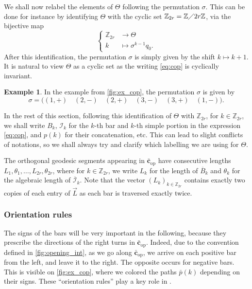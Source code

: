 \documentclass[12pt,twoside]{article}
\theoremstyle{theorem}
\theoremstyle{remark}
\theoremstyle{definition}
\theoremstyle{example}
\newtheorem{expl}[thm]{Example}
\newcommand{\Z}{\mathbb{Z}}
\newcommand{\1}[1]{\mathds{1}_{#1}}
\newcommand{\copg}{{\bar{\mathbf{c}}}_{\mathrm{op}}}
\newcommand{\cI}{\mathcal{I}}
\begin{document}
We shall now relabel the elements of $\Theta$ following the permutation $\sigma$. This can be done
for instance by identifying $\Theta$ with the cyclic set $\Z_{2r} = \Z \diagup 2r \Z$, via the
bijective map
\begin{equation}
  \begin{cases}
    \Z_{2r} & \rightarrow \Theta \\
    k & \mapsto \sigma^{k-1} q_0.
  \end{cases}
\end{equation}
After this identification, the permutation $\sigma$ is simply given by the shift $k \mapsto k+1$.
It is natural to view $\Theta$ as a cyclic set as the writing \eqref{eq:cop} is cyclically
invariant. 

\begin{expl}
  In the example from \cref{fig:ex_cop}, the permutation $\sigma$ is given by
  \begin{equation}
    \label{eq:sigma_expl}
    \sigma = \big((1,+) \quad (2,-) \quad (2,+) \quad (3,-) \quad (3,+) \quad (1,-)\big).
  \end{equation}
\end{expl}

In the rest of this section, following this identification of $\Theta$ with $\Z_{2r}$, for
$k \in \Z_{2r}$, we shall write $B_k$, $\cI_k$ for the $k$-th bar and $k$-th simple portion in the
expression \eqref{eq:cop}, and $p(k)$ for their concatenation, etc. This can lead to slight
conflicts of notations, so we shall always try and clarify which labelling we are using for
$\Theta$.

The orthogonal geodesic segments appearing in $\bar{\mathbf{c}}_{\mathrm{op}}$ have consecutive
lengths $L_1, \theta_1, \ldots, L_{2r}, \theta_{2r}$, where for $k \in \Z_{2r}$, we write $L_k$ for
the length of $\overline{B}_k$ and $\theta_k$ for the algebraic length of $\overline{\cI}_k$. Note
that the vector $(L_k)_{k \in \Z_{2r}}$ contains exactly two copies of each entry of $\vec{L}$ as
each bar is traversed exactly twice.

\subsubsection{Orientation rules}

The signs of the bars will be very important in the following, because they prescribe the directions
of the right turns in $\copg$. Indeed, due to the convention defined in \cref{fig:opening_int}, as
we go along $\copg$, we arrive on each positive bar from the left, and leave it to the right.  The
opposite occurs for negative bars. This is visible on \cref{fig:ex_cop}, where we colored the paths
$\bar{p}(k)$ depending on their signs. These ``orientation rules'' play a key role in
\cite{anantharaman2025}.
\end{document}
